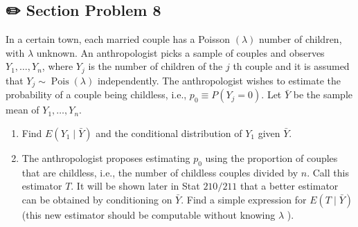 \documentclass[
  letterpaper,
  DIV=11,
  numbers=noendperiod]{scrreprt}
\theoremstyle{plain}
\theoremstyle{definition}
\theoremstyle{remark}
\begin{document}
\hypertarget{section-problem-8}{%
\subsection*{✏️ Section Problem 8}\label{section-problem-8}}

In a certain town, each married couple has a Poisson \((\lambda)\)
number of children, with \(\lambda\) unknown. An anthropologist picks a
sample of couples and observes \(Y_1, \ldots, Y_n\), where \(Y_j\) is
the number of children of the \(j\) th couple and it is assumed that
\(Y_j \sim \operatorname{Pois}(\lambda)\) independently. The
anthropologist wishes to estimate the probability of a couple being
childless, i.e., \(p_0 \equiv P\left(Y_j=0\right)\). Let \(\bar{Y}\) be
the sample mean of \(Y_1, \ldots, Y_n\).

\begin{enumerate}
\def\labelenumi{(\alph{enumi})}
\item
  Find \(E\left(Y_1 \mid \bar{Y}\right)\) and the conditional
  distribution of \(Y_1\) given \(\bar{Y}\).
\item
  The anthropologist proposes estimating \(p_0\) using the proportion of
  couples that are childless, i.e., the number of childless couples
  divided by \(n\). Call this estimator \(T\). It will be shown later in
  Stat \(210 / 211\) that a better estimator can be obtained by
  conditioning on \(\bar{Y}\). Find a simple expression for
  \(E(T \mid \bar{Y})\) (this new estimator should be computable without
  knowing \(\lambda\) ).
\end{enumerate}
\end{document}

